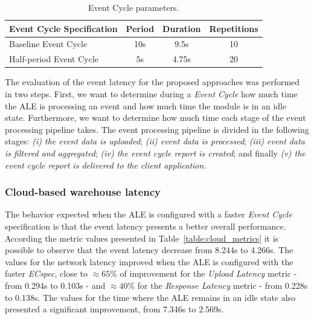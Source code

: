 \begin{table}[ht!]
 \begin{tabular}{|l|c|c|c|}
  \hline
  Event Cycle Specification & Period  & Duration & Repetitions \\ \hline
  Baseline Event Cycle      &  10s    & 9.5s     & 10          \\ \hline
  Half-period Event Cycle   &   5s    & 4.75s    & 20          \\ \hline
 \end{tabular}
 \caption[Event Cycle parameters.]{Event Cycle parameters.}
 \label{table:ecspec_parameters}
\end{table}

The evaluation of the event latency for the proposed approaches was performed in two steps. First,
we want to determine during a \textit{Event Cycle} how much time the \gls{ALE} is processing an event
and how much time the module is in an idle state. Furthermore, we want to determine how much time
each stage of the event processing pipeline takes. The event processing pipeline is divided in the
following stages: \textit{(i) the event data is uploaded}; \textit{(ii) event data is processed};
\textit{(iii) event data is filtered and aggregated}; \textit{(iv) the event cycle report is created};
and finally \textit{(v) the event cycle report is delivered to the client application}.

\subsubsection{Cloud-based warehouse latency}
\label{subs:eval_exp_latency_ecspec_fast}
The behavior expected when the \gls{ALE} is configured with a faster \textit{Event Cycle} specification
is that the event latency presents a better overall performance. According the metric values presented
in Table~\ref{table:cloud_metrics} it is possible to observe that the event latency decrease from 8.244s
to 4.266s. The values for the network latency improved when the \gls{ALE} is configured with the faster
\textit{ECspec}, close to $\approx65\%$ of improvement for the \textit{Upload Latency} metric - from 0.294s
to 0.103s - and $\approx40\%$ for the \textit{Response Latency} metric - from 0.228s to 0.138s. The
values for the time where the \gls{ALE} remains in an idle state also presented a significant
improvement, from 7.346s to 2.569s.\\



